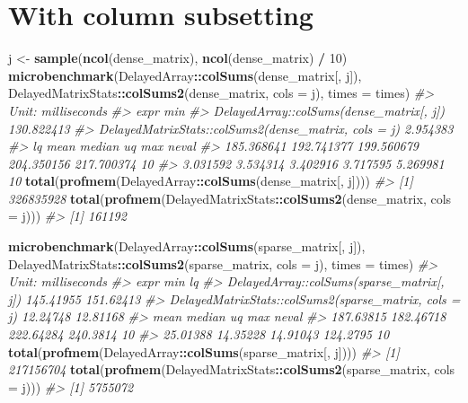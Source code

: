 \documentclass[]{book}
\newenvironment{Shaded}{\begin{snugshade}}{\end{snugshade}}
\newcommand{\KeywordTok}[1]{\textcolor[rgb]{0.13,0.29,0.53}{\textbf{#1}}}
\newcommand{\DataTypeTok}[1]{\textcolor[rgb]{0.13,0.29,0.53}{#1}}
\newcommand{\DecValTok}[1]{\textcolor[rgb]{0.00,0.00,0.81}{#1}}
\newcommand{\StringTok}[1]{\textcolor[rgb]{0.31,0.60,0.02}{#1}}
\newcommand{\CommentTok}[1]{\textcolor[rgb]{0.56,0.35,0.01}{\textit{#1}}}
\newcommand{\OperatorTok}[1]{\textcolor[rgb]{0.81,0.36,0.00}{\textbf{#1}}}
\newcommand{\NormalTok}[1]{#1}
\begin{document}
\section{With column subsetting}\label{with-column-subsetting}

\begin{Shaded}
\begin{Highlighting}[]
\NormalTok{j <-}\StringTok{ }\KeywordTok{sample}\NormalTok{(}\KeywordTok{ncol}\NormalTok{(dense_matrix), }\KeywordTok{ncol}\NormalTok{(dense_matrix) }\OperatorTok{/}\StringTok{ }\DecValTok{10}\NormalTok{)}
\KeywordTok{microbenchmark}\NormalTok{(DelayedArray}\OperatorTok{::}\KeywordTok{colSums}\NormalTok{(dense_matrix[, j]),}
\NormalTok{               DelayedMatrixStats}\OperatorTok{::}\KeywordTok{colSums2}\NormalTok{(dense_matrix, }\DataTypeTok{cols =}\NormalTok{ j),}
               \DataTypeTok{times =}\NormalTok{ times)}
\CommentTok{#> Unit: milliseconds}
\CommentTok{#>                                                  expr        min}
\CommentTok{#>              DelayedArray::colSums(dense_matrix[, j]) 130.822413}
\CommentTok{#>  DelayedMatrixStats::colSums2(dense_matrix, cols = j)   2.954383}
\CommentTok{#>          lq       mean     median         uq        max neval}
\CommentTok{#>  185.368641 192.741377 199.560679 204.350156 217.700374    10}
\CommentTok{#>    3.031592   3.534314   3.402916   3.717595   5.269981    10}
\KeywordTok{total}\NormalTok{(}\KeywordTok{profmem}\NormalTok{(DelayedArray}\OperatorTok{::}\KeywordTok{colSums}\NormalTok{(dense_matrix[, j])))}
\CommentTok{#> [1] 326835928}
\KeywordTok{total}\NormalTok{(}\KeywordTok{profmem}\NormalTok{(DelayedMatrixStats}\OperatorTok{::}\KeywordTok{colSums2}\NormalTok{(dense_matrix, }\DataTypeTok{cols =}\NormalTok{ j)))}
\CommentTok{#> [1] 161192}

\KeywordTok{microbenchmark}\NormalTok{(DelayedArray}\OperatorTok{::}\KeywordTok{colSums}\NormalTok{(sparse_matrix[, j]),}
\NormalTok{               DelayedMatrixStats}\OperatorTok{::}\KeywordTok{colSums2}\NormalTok{(sparse_matrix, }\DataTypeTok{cols =}\NormalTok{ j),}
               \DataTypeTok{times =}\NormalTok{ times)}
\CommentTok{#> Unit: milliseconds}
\CommentTok{#>                                                   expr       min        lq}
\CommentTok{#>              DelayedArray::colSums(sparse_matrix[, j]) 145.41955 151.62413}
\CommentTok{#>  DelayedMatrixStats::colSums2(sparse_matrix, cols = j)  12.24748  12.81168}
\CommentTok{#>       mean    median        uq      max neval}
\CommentTok{#>  187.63815 182.46718 222.64284 240.3814    10}
\CommentTok{#>   25.01388  14.35228  14.91043 124.2795    10}
\KeywordTok{total}\NormalTok{(}\KeywordTok{profmem}\NormalTok{(DelayedArray}\OperatorTok{::}\KeywordTok{colSums}\NormalTok{(sparse_matrix[, j])))}
\CommentTok{#> [1] 217156704}
\KeywordTok{total}\NormalTok{(}\KeywordTok{profmem}\NormalTok{(DelayedMatrixStats}\OperatorTok{::}\KeywordTok{colSums2}\NormalTok{(sparse_matrix, }\DataTypeTok{cols =}\NormalTok{ j)))}
\CommentTok{#> [1] 5755072}


\end{Highlighting}
\end{Shaded}
\end{document}

